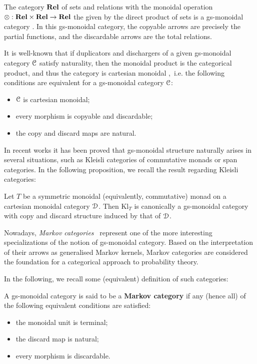\documentclass[a4paper,UKenglish,numberwithinsect,cleveref, autoref, thm-restate]{lipics-v2021}
\theoremstyle{plain} %
\theoremstyle{definition} %
\begin{document}
\begin{example}
The category $\mathbf{Rel}$ of sets and relations with the monoidal operation $\otimes : \mathbf{Rel} \times \mathbf{Rel}\to \mathbf{Rel}$ the given by the direct product of sets is a gs-monoidal category \cite{CorradiniGadducci02}. In this gs-monoidal category, the copyable arrows are precisely the partial functions, and the discardable arrows are the total relations.
\end{example}
\begin{remark}
It is well-known that if duplicators and dischargers of a given gs-monoidal category $\mathcal{C}$ satisfy naturality, then the monoidal product is the categorical product, and thus the category is cartesian monoidal \cite{Fox:CACC},~i.e. the following conditions are equivalent for a gs-monoidal category $\mathcal{C}$:
 \begin{itemize}
  \item $\mathcal{C}$ is cartesian monoidal;
  \item every morphism is copyable and discardable;
  \item the copy and discard maps are natural.
 \end{itemize}
\end{remark}
In recent works \cite{tba} it has been proved that gs-monoidal structure naturally arises in several situations, such as Kleisli categories of commutative monads or span categories. In the following proposition, we recall the result regarding Kleisli categories:
\begin{proposition}\label{monoidalgs}
 Let $T$ be a symmetric monoidal (equivalently, commutative) monad on a cartesian monoidal category $\mathcal{D}$. 
 Then $\mathrm{Kl}_T$ is canonically a gs-monoidal category with copy and discard structure induced by that of $\mathcal{D}$.
\end{proposition}
Nowadays, \emph{Markov categories}~\cite{Fritz_2020} represent one of the more interesting specializations of the notion of gs-monoidal category. Based on the interpretation of their arrows
 as generalised Markov kernels, Markov categories are considered the foundation for a categorical approach to probability theory.


In the following, we recall some (equivalent) definition of such categories:
\begin{definition}
 A gs-monoidal category is said to be a \textbf{Markov category} if any (hence all) of the following equivalent conditions are satisfied:
 \begin{itemize}
  \item the monoidal unit is terminal;
  \item the discard map is natural;
  \item every morphism is discardable.
 \end{itemize}
\end{definition}
\end{document}
